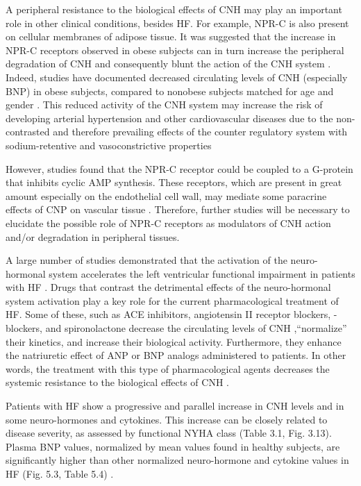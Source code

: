 \documentclass[14pt,a4paper,onecolumn]{extarticle}
\begin{document}
A peripheral resistance to the biological effects of CNH may play an important role in other clinical conditions, besides HF. For example, NPR-C is also present on cellular membranes of adipose tissue. It was suggested that the increase in NPR-C receptors observed in obese subjects can in turn increase the peripheral degradation of CNH and consequently blunt the action of the CNH system \citep{bib351} \citep{bib352}. Indeed, studies have documented decreased circulating levels of CNH (especially BNP) in obese subjects, compared to nonobese subjects matched for age and gender \citep{bib351} \citep{bib354}. This reduced activity of the CNH system may increase the risk of developing arterial hypertension and other cardiovascular diseases due to the non-contrasted and therefore prevailing effects of the counter regulatory system with sodium-retentive and vasoconstrictive properties \citep{bib352} \citep{bib353} \citep{bib354}

However, studies found that the NPR-C receptor could be coupled to a G-protein that inhibits cyclic AMP synthesis. These receptors, which are present in great amount especially on the endothelial cell wall, may mediate some paracrine effects of CNP on vascular tissue \citep{bib355} \citep{bib356} \citep{bib357}. Therefore, further studies will be necessary to elucidate the possible role of NPR-C receptors as modulators of CNH action and/or degradation in peripheral tissues.

A large number of studies demonstrated that the activation of the neuro-hormonal system accelerates the left ventricular functional impairment in patients with HF \citep{bib31} \citep{bib32} \citep{bib33} \citep{bib34} \citep{bib35} \citep{bib36} \citep{bib358} \citep{bib359} \citep{bib360}. Drugs that contrast the detrimental effects of the neuro-hormonal system activation play a key role for the current pharmacological treatment of HF. Some of these, such as ACE inhibitors, angiotensin II receptor blockers, \beta-blockers, and spironolactone decrease the circulating levels of CNH \citep{bib35} \citep{bib361} \citep{bib362} \citep{bib363} \citep{bib364} \citep{bib365},“normalize” their kinetics, and increase their biological activity. Furthermore, they enhance the natriuretic effect of ANP or BNP analogs administered to patients. In other words, the treatment with this type of pharmacological agents decreases the systemic resistance to the biological effects of CNH \citep{bib324} \citep{bib326}.

Patients with HF show a progressive and parallel increase in CNH levels and in some neuro-hormones and cytokines. This increase can be closely related to disease severity, as assessed by functional NYHA class (Table 3.1, Fig. 3.13). Plasma BNP values, normalized by mean values found in healthy subjects, are significantly higher than other normalized neuro-hormone and cytokine values in HF (Fig. 5.3, Table 5.4) \citep{bib360}.
\end{document}
